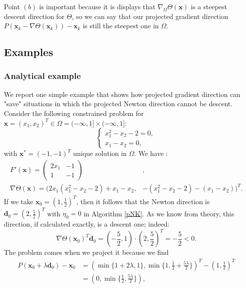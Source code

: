 Point $ (b) $ is important because it is displays that $ \nabla_{\Omega} \Theta (\textbf{x}) $ is a steepest descent direction for $ \Theta $, so we can say that our projected gradient direction $  P(\textbf{x}_k - \nabla \Theta(\textbf{x}_k)) - \textbf{x}_k  $ is still the steepest one in $ \Omega $.
\subsection{Examples}
\subsubsection{Analytical example}
We report one simple example that shows how projected gradient direction can "save" situations in which the projected Newton direction cannot be descent. 
Consider the following constrained problem for $ \textbf{x} = (x_1, x_2)^T \in \Omega = (-\infty, 1] \times (-\infty, 1] $:
\begin{equation*}
\begin{cases}
x_1^2 - x_2 -2 = 0,\\
x_1 - x_2 = 0,
\end{cases}
\end{equation*}
with $\textbf{x}^* = (-1,-1)^T  $ unique solution in $ \Omega $. We have :
\begin{eqnarray*}
	F'(\textbf{x}) = \begin{pmatrix}
		2x_1 & -1 \\
		1 & -1
	\end{pmatrix}&,\\
	\nabla \Theta (\textbf{x}) = (2x_1(x_1^2-x_2-2)+x_1-x_2,& -(x_1^2-x_2-2)-(x_1-x_2))^T.
\end{eqnarray*}
If we take $ \textbf{x}_0 = (1, \frac{1}{2})^T $, then it follows that the Newton direction is $ \textbf{d}_0 = (2, \frac{5}{2})^T $ with $ \eta_0 = 0 $ in Algorithm \ref{pNK}. As we know from theory, this direction, if calculated exactly, is a descent one; indeed:
\begin{equation*}
\nabla \Theta (\textbf{x}_0)^T\textbf{d}_0 = \left(-\frac{5}{2}, 1\right) \cdot \left(2, \frac{5}{2}\right)^T = - \frac{5}{2} < 0.
\end{equation*}
The problem comes when we project it because we find
\begin{eqnarray*}
	P (\textbf{x}_0 +\lambda \textbf{d}_0) - \textbf{x}_0 &= \left( \min\{1+2\lambda, 1 \},\min \{1, \frac{1}{2} + \frac{5\lambda}{2}\} \right)^T - \left(1, \frac{1}{2}\right)^T \\
	&=\left(0, \min \{\frac{1}{2}, \frac{5\lambda}{2} \}\right),
\end{eqnarray*}
